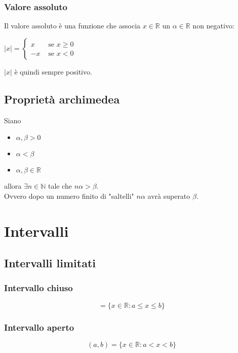 \documentclass[a4paper,12pt, oneside]{book}
\begin{document}
\subsubsection{Valore assoluto}
Il valore assoluto è una funzione che associa $x\in\mathbb{R}$ un $\alpha\in\mathbb{R}$ non negativo:
\begin{center}
 $|x|=\left\{
                \begin{array}{ll}
               	  x &\mbox{ se } x\geq0\\
               	 -x &\mbox{ se } x<0
				\end{array}
				\right.$
\end{center}
$|x|$ è quindi sempre positivo.
\subsection{Proprietà archimedea}
\begin{teorema}
Siano
\begin{itemize}
	\item $\alpha,\beta>0$
	\item $\alpha<\beta$
	\item $\alpha,\beta \in \mathbb{R}$
\end{itemize}
allora $\exists n \in \mathbb{N}$ tale che $n\alpha>\beta$.\\
Ovvero dopo un numero finito di "saltelli" $n\alpha$ avrà superato $\beta$.
\end{teorema}
\newpage
\section{Intervalli}
\subsection{Intervalli limitati}
\subsubsection{Intervallo chiuso}
\begin{equation}
[a,b]=\{x\in\mathbb{R}\colon a\leq x\leq b\}	
\end{equation}
\subsubsection{Intervallo aperto}
\begin{equation}
(a,b)=\{x\in\mathbb{R}\colon a<x<b\}	
\end{equation}
\end{document}
